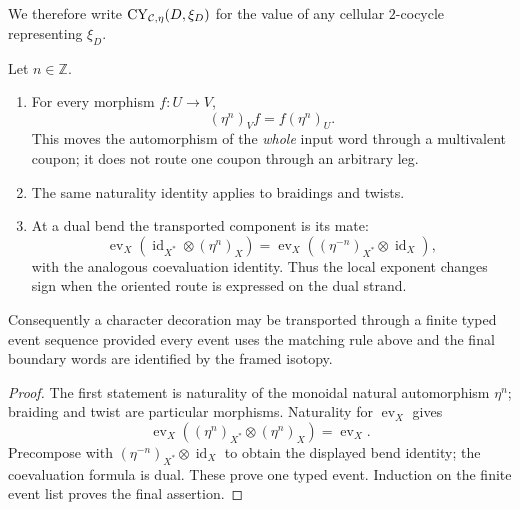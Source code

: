 We therefore write $\operatorname{CY}_{\mathcal{C},\eta}(D,\xi_D)$ for the value of any cellular
$2$-cocycle representing $\xi_D$.

\begin{lemma}
\label{lem:finite-coupon-transport}
Let $n\in\mathbb Z$.
\begin{enumerate}[label=(\roman*),ref=\roman*]
  \item For every morphism $f\colon U\to V$,
  \[
    (\eta^n)_Vf=f(\eta^n)_U.
  \]
  This moves the automorphism of the \emph{whole} input word through a
  multivalent coupon; it does not route one coupon through an arbitrary leg.

  \item The same naturality identity applies to braidings and twists.

  \item At a dual bend the transported component is its mate:
  \[
    \operatorname{ev}_X
      (\operatorname{id}_{X^*}\otimes(\eta^n)_X)
    =
    \operatorname{ev}_X
      ((\eta^{-n})_{X^*}\otimes\operatorname{id}_X),
  \]
  with the analogous coevaluation identity.  Thus the local exponent changes
  sign when the oriented route is expressed on the dual strand.
\end{enumerate}
Consequently a character decoration may be transported through a finite
typed event sequence provided every event uses the matching rule above and
the final boundary words are identified by the framed isotopy.
\end{lemma}

\begin{proof}
The first statement is naturality of the monoidal natural automorphism
$\eta^n$; braiding and twist are particular morphisms.  Naturality for
$\operatorname{ev}_X$ gives
\[
 \operatorname{ev}_X
 ((\eta^n)_{X^*}\otimes(\eta^n)_X)=\operatorname{ev}_X.
\]
Precompose with $(\eta^{-n})_{X^*}\otimes\operatorname{id}_X$ to obtain the
displayed bend identity; the coevaluation formula is dual.  These prove one
typed event.  Induction on the finite event list proves the final assertion.
\end{proof}

